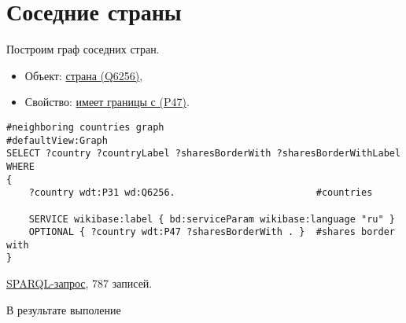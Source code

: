 \section{Соседние страны}

Построим граф соседних стран.

\begin{itemize}
    \item Объект: \href{https://www.wikidata.org/wiki/Q6256}{страна (Q6256)},
    \item Свойство: \href{https://www.wikidata.org/wiki/Property:P47}{имеет границы с (P47)}.
\end{itemize}

\begin{lstlisting}[language=SPARQL]
#neighboring countries graph
#defaultView:Graph
SELECT ?country ?countryLabel ?sharesBorderWith ?sharesBorderWithLabel
WHERE
{
    ?country wdt:P31 wd:Q6256.                         #countries

    SERVICE wikibase:label { bd:serviceParam wikibase:language "ru" }
    OPTIONAL { ?country wdt:P47 ?sharesBorderWith . }  #shares border with
}
\end{lstlisting}

\href{https://query.wikidata.org/#%23neighboring%20countries%20graph%0A%23defaultView%3AGraph%0ASELECT%20%3Fcountry%20%3FcountryLabel%20%3FsharesBorderWith%20%3FsharesBorderWithLabel%0AWHERE%0A%7B%0A%20%20%20%20%3Fcountry%20wdt%3AP31%20wd%3AQ6256.%0A%0A%20%20%20%20SERVICE%20wikibase%3Alabel%20%7B%20bd%3AserviceParam%20wikibase%3Alanguage%20%22ru%22%20%7D%0A%20%20%20%20OPTIONAL%20%7B%20%3Fcountry%20wdt%3AP47%20%3FsharesBorderWith%20.%20%7D%0A%0A%7D%0A}{SPARQL-запрос}, 787 записей.

В результате выполение

